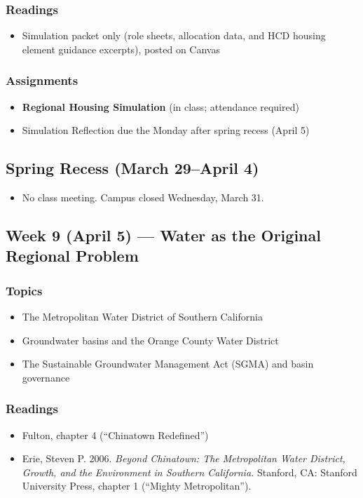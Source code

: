 \documentclass[12pt]{article}
\begin{document}
    \subsubsection*{Readings}
        \begin{itemize}
            \item Simulation packet only (role sheets, allocation data, and HCD housing element guidance excerpts), posted on Canvas
        \end{itemize}
    \subsubsection*{Assignments}
        \begin{itemize}
            \item \textbf{Regional Housing Simulation} (in class; attendance required)
            \item Simulation Reflection due the Monday after spring recess (April 5)
        \end{itemize}

\subsection*{Spring Recess (March 29--April 4)}
    \begin{itemize}
        \item No class meeting. Campus closed Wednesday, March 31.
    \end{itemize}

\subsection*{Week 9 (April 5) --- Water as the Original Regional Problem}
    \subsubsection*{Topics}
        \begin{itemize}
            \item The Metropolitan Water District of Southern California
            \item Groundwater basins and the Orange County Water District
            \item The Sustainable Groundwater Management Act (SGMA) and basin governance
        \end{itemize}
    \subsubsection*{Readings}
        \begin{itemize}
            \item Fulton, chapter 4 (``Chinatown Redefined'')
            \item Erie, Steven P. 2006. \emph{Beyond Chinatown: The Metropolitan Water District, Growth, and the Environment in Southern California.} Stanford, CA: Stanford University Press, chapter 1 (``Mighty Metropolitan'').
        \end{itemize}
\end{document}
